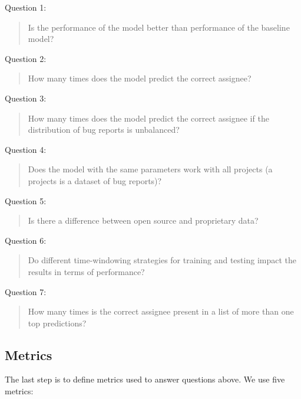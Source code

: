 \begin{framed}
  \hypertarget{question:1}{Question 1:}
  \begin{quote}
    Is the performance of the model better than performance of the baseline model?
  \end{quote}

  \hypertarget{question:2}{Question 2:}
  \begin{quote}
    How many times does the model predict the correct assignee?
  \end{quote}

  \hypertarget{question:3}{Question 3:}
  \begin{quote}
    How many times does the model predict the correct assignee if the distribution of bug reports is unbalanced?
  \end{quote}

  \hypertarget{question:4}{Question 4:}
  \begin{quote}
    Does the model with the same parameters work with all projects (a projects is a dataset of bug reports)?
  \end{quote}

  \hypertarget{question:5}{Question 5:}
  \begin{quote}
    Is there a difference between open source and proprietary data?
  \end{quote}

  \hypertarget{question:6}{Question 6:}
  \begin{quote}
    Do different time-windowing strategies for training and testing impact the results in terms of performance?
  \end{quote}

  \hypertarget{question:7}{Question 7:}
  \begin{quote}
    How many times is the correct assignee present in a list of more than one top predictions?
  \end{quote}

\end{framed}

\subsection{Metrics}

The last step is to define metrics used to answer questions above. We use five metrics:

